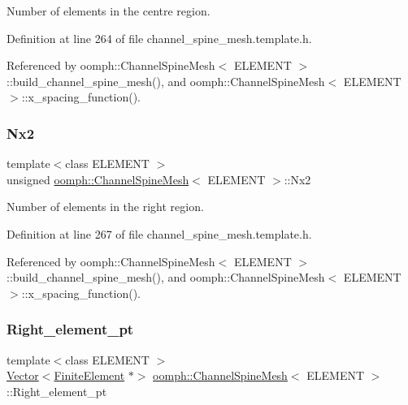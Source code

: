 Number of elements in the centre region. 



Definition at line 264 of file channel\+\_\+spine\+\_\+mesh.\+template.\+h.



Referenced by oomph\+::\+Channel\+Spine\+Mesh$<$ E\+L\+E\+M\+E\+N\+T $>$\+::build\+\_\+channel\+\_\+spine\+\_\+mesh(), and oomph\+::\+Channel\+Spine\+Mesh$<$ E\+L\+E\+M\+E\+N\+T $>$\+::x\+\_\+spacing\+\_\+function().

\mbox{\label{classoomph_1_1ChannelSpineMesh_a46534250de6f75890463bfddefdb39cd}} 
\subsubsection{\texorpdfstring{Nx2}{Nx2}}
{\footnotesize\ttfamily template$<$class E\+L\+E\+M\+E\+NT $>$ \\
unsigned \hyperlink{classoomph_1_1ChannelSpineMesh}{oomph\+::\+Channel\+Spine\+Mesh}$<$ E\+L\+E\+M\+E\+NT $>$\+::Nx2\hspace{0.3cm}{\ttfamily [protected]}}



Number of elements in the right region. 



Definition at line 267 of file channel\+\_\+spine\+\_\+mesh.\+template.\+h.



Referenced by oomph\+::\+Channel\+Spine\+Mesh$<$ E\+L\+E\+M\+E\+N\+T $>$\+::build\+\_\+channel\+\_\+spine\+\_\+mesh(), and oomph\+::\+Channel\+Spine\+Mesh$<$ E\+L\+E\+M\+E\+N\+T $>$\+::x\+\_\+spacing\+\_\+function().

\mbox{\label{classoomph_1_1ChannelSpineMesh_a1cc77e7badcd1756b03aa307534011ec}} 
\subsubsection{\texorpdfstring{Right\+\_\+element\+\_\+pt}{Right\_element\_pt}}
{\footnotesize\ttfamily template$<$class E\+L\+E\+M\+E\+NT $>$ \\
\hyperlink{classoomph_1_1Vector}{Vector}$<$\hyperlink{classoomph_1_1FiniteElement}{Finite\+Element} $\ast$$>$ \hyperlink{classoomph_1_1ChannelSpineMesh}{oomph\+::\+Channel\+Spine\+Mesh}$<$ E\+L\+E\+M\+E\+NT $>$\+::Right\+\_\+element\+\_\+pt\hspace{0.3cm}{\ttfamily [protected]}}



